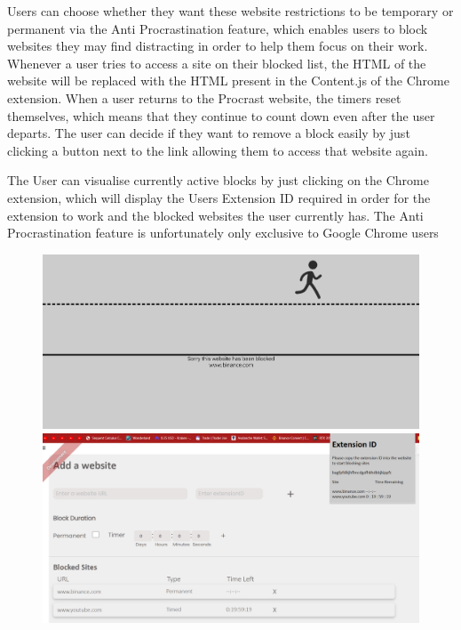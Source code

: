 \documentclass[a4paper]{article}
\begin{document}
Users can choose whether they want these website restrictions to be temporary or permanent via the Anti Procrastination feature, which enables users to block websites they may find distracting in order to help them focus on their work.
Whenever a user tries to access a site on their blocked list, the HTML of the
website will be replaced with the HTML present in the Content.js of the Chrome extension.
When a user returns to the Procrast website, the timers reset themselves, which means that they continue to count down even after the user departs.
The user can decide if they want to remove a block easily by just clicking a button next to the link allowing them to access that website again.

The User can visualise currently active blocks by just clicking on the Chrome extension,  which will display the Users Extension ID required in order for the extension to work and the blocked websites the user currently has.
The Anti Procrastination feature is unfortunately only exclusive to Google Chrome users

\begin{figure}[H]
    \centering
    \begin{minipage}{0.49\textwidth}
      \centering
      \includegraphics[width=\linewidth]{./image/BlockedWebsite.png}
    \end{minipage}\hfill
    \begin{minipage}{0.49\textwidth}
      \centering
      \includegraphics[width=\linewidth]{./image/AntiProcr.png}
    \end{minipage}
\end{figure}
\end{document}
